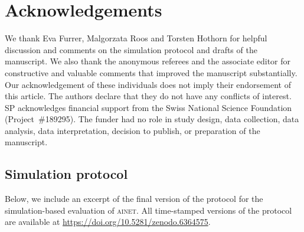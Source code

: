 \documentclass[a4paper, 11pt]{article}
\newcommand{\ainet}{\textsc{ainet}}
\begin{document}
\section*{Acknowledgements}
We thank Eva Furrer, Malgorzata Roos and Torsten Hothorn for
helpful discussion and comments on the simulation protocol and drafts of the
manuscript.
We also thank the anonymous referees and the associate editor for constructive
and valuable comments that improved the manuscript substantially.
Our acknowledgement of these individuals does not imply their endorsement of this article.
The authors declare that they do not have any conflicts of interest.
SP acknowledges financial support from the Swiss National Science Foundation
(Project~\#189295). The funder had no role in study design, data collection,
data analysis, data interpretation, decision to publish, or preparation of
the manuscript.

\begin{appendices}

\section{Simulation protocol}
\label{appendix:protocol}

Below, we include an excerpt of the final version of the protocol for the
simulation-based evaluation of \ainet{}. All time-stamped versions
of the protocol are available at \url{https://doi.org/10.5281/zenodo.6364575}.



% 

\end{appendices}



\end{document}
